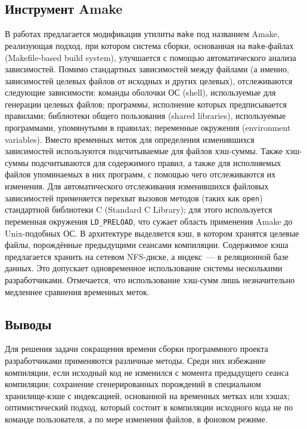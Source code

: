 \subsection{Инструмент Amake}
В работах \cite{amake2012, amake2013} предлагается модификация утилиты \texttt{make} под названием Amake, реализующая подход, при котором система сборки, основанная на \texttt{make}-файлах (Makefile-based build system), улучшается с помощью автоматического анализа зависимостей. Помимо стандартных зависимостей между файлами (а именно, зависимостей целевых файлов от исходных и других целевых), отслеживаются следующие зависимости: команды оболочки ОС (shell), используемые для генерации целевых файлов; программы, исполнение которых предписывается правилами; библиотеки общего пользования (shared libraries), используемые программами, упомянутыми в правилах; переменные окружения (environment variables). Вместо временных меток для определения изменившихся зависимостей используются подсчитываемые для файлов хэш-суммы. Также хэш-суммы подсчитываются для содержимого правил, а также для исполняемых файлов упоминаемых в них программ, с помощью чего отслеживаются их изменения. Для автоматического отслеживания изменившихся файловых зависимостей применяется перехват вызовов методов (таких как \texttt{open}) стандартной библиотеки C (Standard C Library); для этого используется переменная окружения \texttt{LD\_PRELOAD}, что сужает область применения Amake до Unix-подобных ОС. В архитектуре выделяется кэш, в котором хранятся целевые файлы, порождённые предыдущими сеансами компиляции. Содержимое кэша предлагается хранить на сетевом NFS-диске, а индекс~--- в реляционной базе данных. Это допускает одновременное использование системы несколькими разработчиками. Отмечается, что использование хэш-сумм лишь незначительно медленнее сравнения временных меток.\\

\subsection{Выводы}
Для решения задачи сокращения времени сборки программного проекта разработчиками применяются различные методы. Среди них избежание компиляции, если исходный код не изменился с момента предыдущего сеанса компиляции; сохранение сгенерированных порождений в специальном хранилище-кэше с индексацией, основанной на временных метках или хэшах; оптимистический подход, который состоит в компиляции исходного кода не по команде пользователя, а по мере изменения файлов, в фоновом режиме.

